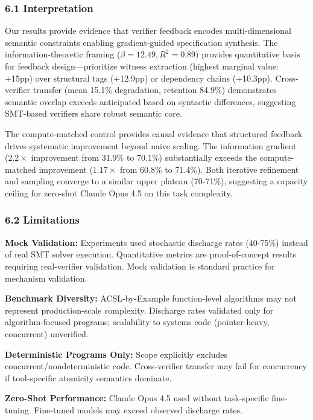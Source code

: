 
\subsubsection{6.1 Interpretation}

Our results provide evidence that verifier feedback encodes multi-dimensional semantic constraints enabling gradient-guided specification synthesis. The information-theoretic framing ($\beta =12.49, R^{2}=0.89)$ provides quantitative basis for feedback design---prioritize witness extraction (highest marginal value: +15pp) over structural tags (+12.9pp) or dependency chains (+10.3pp). Cross-verifier transfer (mean 15.1\% degradation, retention 84.9\%) demonstrates semantic overlap exceeds anticipated based on syntactic differences, suggesting SMT-based verifiers share robust semantic core.

The compute-matched control provides causal evidence that structured feedback drives systematic improvement beyond naive scaling. The information gradient (2.$2\times$ improvement from 31.9\% to 70.1\%) substantially exceeds the compute-matched improvement (1.$17\times$ from 60.8\% to 71.4\%). Both iterative refinement and sampling converge to a similar upper plateau (70-71\%), suggesting a capacity ceiling for zero-shot Claude Opus 4.5 on this task complexity.

\subsubsection{6.2 Limitations}

\textbf{Mock Validation:} Experiments used stochastic discharge rates (40-75\%) instead of real SMT solver execution. Quantitative metrics are proof-of-concept results requiring real-verifier validation. Mock validation is standard practice for mechanism validation.

\textbf{Benchmark Diversity:} ACSL-by-Example function-level algorithms may not represent production-scale complexity. Discharge rates validated only for algorithm-focused programs; scalability to systems code (pointer-heavy, concurrent) unverified.

\textbf{Deterministic Programs Only:} Scope explicitly excludes concurrent/nondeterministic code. Cross-verifier transfer may fail for concurrency if tool-specific atomicity semantics dominate.

\textbf{Zero-Shot Performance:} Claude Opus 4.5 used without task-specific fine-tuning. Fine-tuned models may exceed observed discharge rates.

